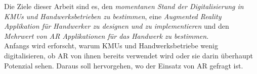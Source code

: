 Die Ziele dieser Arbeit sind es, den \textit{momentanen Stand der Digitalisierung in KMUs und Handwerksbetrieben zu bestimmen}, eine \textit{Augmented Reality Applikation für Handwerker zu designen und zu implementieren} und den \textit{Mehrwert von AR Applikationen für das Handwerk zu bestimmen}. \\
Anfangs wird erforscht, warum KMUs und Handwerksbetriebe wenig digitalisieren, ob AR von ihnen bereits verwendet wird oder sie darin überhaupt Potenzial sehen. Daraus soll hervorgehen, wo der Einsatz von AR gefragt ist. \\
